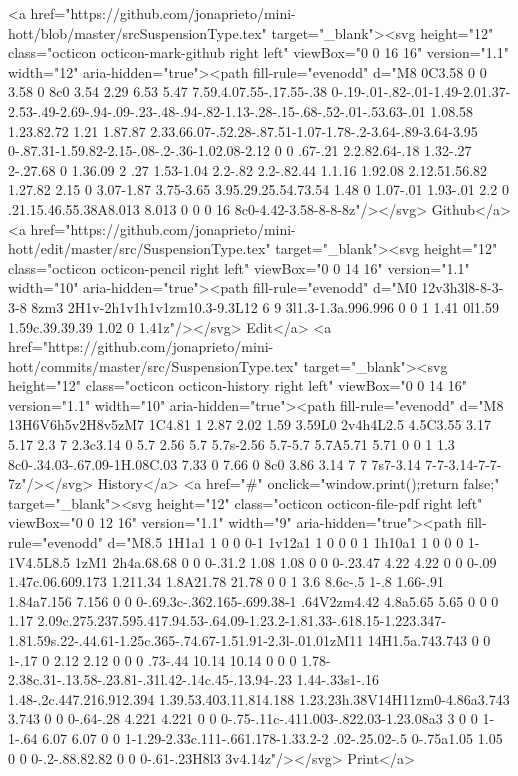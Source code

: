       <a href="https://github.com/jonaprieto/mini-hott/blob/master/srcSuspensionType.tex" target="_blank"><svg height="12" class="octicon octicon-mark-github right left" viewBox="0 0 16 16" version="1.1" width="12" aria-hidden="true"><path fill-rule="evenodd" d="M8 0C3.58 0 0 3.58 0 8c0 3.54 2.29 6.53 5.47 7.59.4.07.55-.17.55-.38 0-.19-.01-.82-.01-1.49-2.01.37-2.53-.49-2.69-.94-.09-.23-.48-.94-.82-1.13-.28-.15-.68-.52-.01-.53.63-.01 1.08.58 1.23.82.72 1.21 1.87.87 2.33.66.07-.52.28-.87.51-1.07-1.78-.2-3.64-.89-3.64-3.95 0-.87.31-1.59.82-2.15-.08-.2-.36-1.02.08-2.12 0 0 .67-.21 2.2.82.64-.18 1.32-.27 2-.27.68 0 1.36.09 2 .27 1.53-1.04 2.2-.82 2.2-.82.44 1.1.16 1.92.08 2.12.51.56.82 1.27.82 2.15 0 3.07-1.87 3.75-3.65 3.95.29.25.54.73.54 1.48 0 1.07-.01 1.93-.01 2.2 0 .21.15.46.55.38A8.013 8.013 0 0 0 16 8c0-4.42-3.58-8-8-8z"/></svg> Github</a>
      <a href="https://github.com/jonaprieto/mini-hott/edit/master/src/SuspensionType.tex" target="_blank"><svg height="12" class="octicon octicon-pencil right left" viewBox="0 0 14 16" version="1.1" width="10" aria-hidden="true"><path fill-rule="evenodd" d="M0 12v3h3l8-8-3-3-8 8zm3 2H1v-2h1v1h1v1zm10.3-9.3L12 6 9 3l1.3-1.3a.996.996 0 0 1 1.41 0l1.59 1.59c.39.39.39 1.02 0 1.41z"/></svg> Edit</a>
      <a href="https://github.com/jonaprieto/mini-hott/commits/master/src/SuspensionType.tex" target="_blank"><svg height="12" class="octicon octicon-history right left" viewBox="0 0 14 16" version="1.1" width="10" aria-hidden="true"><path fill-rule="evenodd" d="M8 13H6V6h5v2H8v5zM7 1C4.81 1 2.87 2.02 1.59 3.59L0 2v4h4L2.5 4.5C3.55 3.17 5.17 2.3 7 2.3c3.14 0 5.7 2.56 5.7 5.7s-2.56 5.7-5.7 5.7A5.71 5.71 0 0 1 1.3 8c0-.34.03-.67.09-1H.08C.03 7.33 0 7.66 0 8c0 3.86 3.14 7 7 7s7-3.14 7-7-3.14-7-7-7z"/></svg> History</a>
      <a  href="#" onclick="window.print();return false;" target="_blank"><svg height="12" class="octicon octicon-file-pdf right left" viewBox="0 0 12 16" version="1.1" width="9" aria-hidden="true"><path fill-rule="evenodd" d="M8.5 1H1a1 1 0 0 0-1 1v12a1 1 0 0 0 1 1h10a1 1 0 0 0 1-1V4.5L8.5 1zM1 2h4a.68.68 0 0 0-.31.2 1.08 1.08 0 0 0-.23.47 4.22 4.22 0 0 0-.09 1.47c.06.609.173 1.211.34 1.8A21.78 21.78 0 0 1 3.6 8.6c-.5 1-.8 1.66-.91 1.84a7.156 7.156 0 0 0-.69.3c-.362.165-.699.38-1 .64V2zm4.42 4.8a5.65 5.65 0 0 0 1.17 2.09c.275.237.595.417.94.53-.64.09-1.23.2-1.81.33-.618.15-1.223.347-1.81.59s.22-.44.61-1.25c.365-.74.67-1.51.91-2.3l-.01.01zM11 14H1.5a.743.743 0 0 1-.17 0 2.12 2.12 0 0 0 .73-.44 10.14 10.14 0 0 0 1.78-2.38c.31-.13.58-.23.81-.31l.42-.14c.45-.13.94-.23 1.44-.33s1-.16 1.48-.2c.447.216.912.394 1.39.53.403.11.814.188 1.23.23h.38V14H11zm0-4.86a3.743 3.743 0 0 0-.64-.28 4.221 4.221 0 0 0-.75-.11c-.411.003-.822.03-1.23.08a3 3 0 0 1-1-.64 6.07 6.07 0 0 1-1.29-2.33c.111-.661.178-1.33.2-2 .02-.25.02-.5 0-.75a1.05 1.05 0 0 0-.2-.88.82.82 0 0 0-.61-.23H8l3 3v4.14z"/></svg> Print</a>
